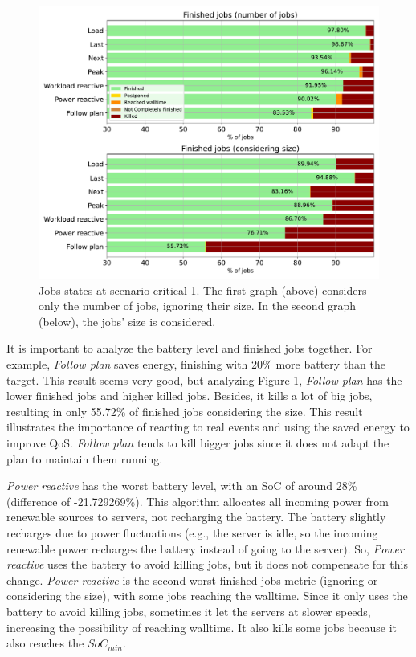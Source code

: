 \begin{figure}[!htb]
    \centering
    \includegraphics[scale=0.55]{Images/Compensations/jobs_critical_1.pdf}
    \caption{Jobs states at scenario critical 1. The first graph (above) considers only the number of jobs, ignoring their size. In the second graph (below), the jobs' size is considered.}
    \label{fig:jobs_critical_1}
\end{figure}

It is important to analyze the battery level and finished jobs together. For example, \emph{Follow plan} saves energy, finishing with 20\% more battery than the target. This result seems very good, but analyzing Figure \ref{fig:jobs_critical_1}, \emph{Follow plan} has the lower finished jobs and higher killed jobs. Besides, it kills a lot of big jobs, resulting in only 55.72\% of finished jobs considering the size. This result illustrates the importance of reacting to real events and using the saved energy to improve QoS. \emph{Follow plan} tends to kill bigger jobs since it does not adapt the plan to maintain them running.

\emph{Power reactive} has the worst battery level, with an SoC of around 28\% (difference of -21.729269\%). This algorithm allocates all incoming power from renewable sources to servers, not recharging the battery. The battery slightly recharges due to power fluctuations (e.g., the server is idle, so the incoming renewable power recharges the battery instead of going to the server). So, \emph{Power reactive} uses the battery to avoid killing jobs, but it does not compensate for this change. \emph{Power reactive} is the second-worst finished jobs metric (ignoring or considering the size), with some jobs reaching the walltime. Since it only uses the battery to avoid killing jobs, sometimes it let the servers at slower speeds, increasing the possibility of reaching walltime. It also kills some jobs because it also reaches the $SoC_{min}$.

